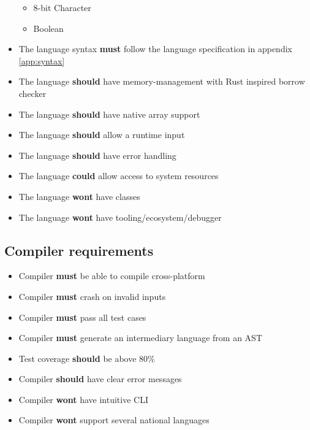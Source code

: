 \begin{itemize}
\begin{itemize}
\item 8-bit Character
\item Boolean
\end{itemize}
\item The language syntax \textbf{must} follow the language specification in appendix \ref{app:syntax}
\item The language \textbf{should} have memory-management with Rust inspired borrow checker
\item The language \textbf{should} have native array support
\item The language \textbf{should} allow a runtime input
\item The language \textbf{should} have error handling
\item The language \textbf{could} allow access to system resources
\item The language \textbf{wont} have classes
\item The language \textbf{wont} have tooling/ecosystem/debugger
\end{itemize}

\subsection{Compiler requirements} %

\begin{itemize}
\item Compiler \textbf{must} be able to compile cross-platform
\item Compiler \textbf{must} crash on invalid inputs
\item Compiler \textbf{must} pass all test cases
\item Compiler \textbf{must} generate an intermediary language from an AST
\item Test coverage \textbf{should} be above 80\%
\item Compiler \textbf{should} have clear error messages
\item Compiler \textbf{wont} have intuitive CLI
\item Compiler \textbf{wont} support several national languages
\end{itemize}
